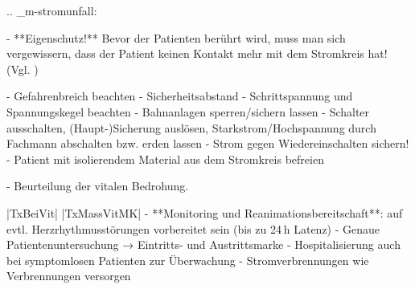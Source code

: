 {
.. _m-stromunfall:

}
{
\begin{itemize}
  -   **Eigenschutz!** Bevor der Patienten berührt wird,
  muss man sich vergewissern, dass der Patient
  keinen Kontakt mehr mit dem Stromkreis hat!  (Vgl. )
  \begin{itemize}
    -   Gefahrenbreich beachten
    -   Sicherheitsabstand
    -   Schrittspannung und Spannungskegel
    beachten 
    -   Bahnanlagen sperren/sichern lassen
    -   Schalter ausschalten, (Haupt-)Sicherung
    auslösen, Starkstrom/Hochspannung durch Fachmann  abschalten bzw.
    erden lassen
    -   Strom gegen Wiedereinschalten sichern!
    -   Patient mit isolierendem Material aus dem Stromkreis befreien
  \end{itemize}
  -   Beurteilung der vitalen Bedrohung.
  \par |TxBeiVit|
  |TxMassVitMK|
  -   **Monitoring und
  Reanimationsbereitschaft**: auf evtl.
  Herzrhythmusstörungen vorbereitet sein
  (bis zu 24 h Latenz)
  -   Genaue Patientenuntersuchung →
  Eintritts- und Austrittsmarke
  -   Hospitalisierung auch bei symptomlosen
  Patienten zur Überwachung
  -   Stromverbrennungen wie Verbrennungen versorgen
\end{itemize}
}
